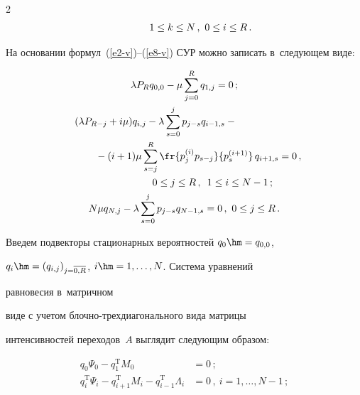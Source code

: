 \begin{multicols}{2}
\begin{align*}
  &\hspace*{15mm} 1\leq k\leq N\,,\ 0\leq 

i\leq R\,.

  \end{align*}

  

  На основании формул~(\ref{e2-v})--(\ref{e8-v}) СУР можно записать в~следующем виде:

  \begin{gather*}

  \lambda P_R q_{0,0} -\mu \sum\limits_{j=0}^R q_{1,j}=0\,;\\

  \hspace*{-20mm}(\lambda P_{R-j}+i\mu)q_{i,j}-\lambda \sum\limits_{s=0}^j p_{j-s} q_{i-1,s} -{}\\

 \hspace*{10mm} {}- 

(i+1) \mu \sum\limits_{s=j}^R \fr{p_j^{(i)} p_{s-j}}{p_s^{(i+1)}}\,q_{i+1,s}=0\,,\\

  \hspace*{20mm}0\leq j\leq R\,,\enskip 1\leq i\leq N-1\,;\\

  N\mu q_{N,j} -\lambda \sum\limits_{s=0}^j p_{j-s} q_{N-1,s}=0\,,\ 0\leq j\leq 

R\,.

  \end{gather*}

  

  Введем подвекторы стационарных вероятностей $q_0\hm= q_{0,0}$, 

$q_i\hm= (q_{i,j})_{j=\overline{0,R}}$, $i\hm= 1,\ldots ,N$. Сис\-те\-ма урав\-не\-ний

равновесия в~мат\-рич\-ном 

виде с учетом блоч\-но-трех\-диа\-го\-наль\-но\-го вида матрицы 

интенсивностей переходов~$A$ выглядит следующим образом:

  \begin{align*}

  q_0\Psi_0-q_1^{\mathrm{T}} {M}_0&=0\,;\\

  q_i^{\mathrm{T}} \Psi_i -q_{i+1}^{\mathrm{T}} {M}_i -q_{i-1}^{\mathrm{T}} \Lambda_i &=0\,,\ i=1,\ldots, 

N-1\,;\\


\end{align*}
\end{multicols}
